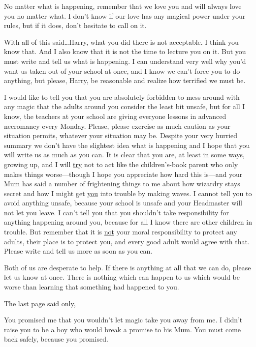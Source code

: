 \begin{writtenNote}
No matter what is happening, remember that we love you and will always
love you no matter what. I don't know if our love has any magical power under
your rules, but if it does, don't hesitate to call on it.

With all of this said…Harry, what you did there is not
acceptable. I think you know that. And I also know that it is not the time to
lecture you on it. But you must write and tell us what is happening. I can
understand very well why you'd want us taken out of your school at once, and I
know we can't force you to do anything, but please, Harry, be reasonable and
realize how terrified we must be.

I would like to tell you that you are absolutely forbidden to mess around
with any magic that the adults around you consider the least bit unsafe, but
for all I know, the teachers at your school are giving everyone lessons in
advanced necromancy every Monday. Please, please exercise as much caution as
your situation permits, whatever your situation may be. Despite your very
hurried summary we don't have the slightest idea what is happening and I hope
that you will write us as much as you can. It is clear that you are, at least
in some ways, growing up, and I will \underline{try} not to act like the
children's-book parent who only makes things worse---though I hope you
appreciate how hard this is---and your Mum has said a number of frightening
things to me about how wizardry stays secret and how I might get
\underline{you} into trouble by making waves. I cannot tell you to avoid
anything unsafe, because your school is unsafe and your Headmaster will not let
you leave. I can't tell you that you shouldn't take responsibility for anything
happening around you, because for all I know there are other children in
trouble. But remember that it is \underline{not} your moral responsibility to
protect any adults, their place is to protect you, and every good adult would
agree with that. Please write and tell us more as soon as you can.

Both of us are desperate to help. If there is anything at all that we can
do, please let us know at once. There is nothing which can happen to us which
would be worse than learning that something had happened to you.

\end{writtenNote}

The last page said only,

\begin{writtenNote}
You promised me that you wouldn't let magic take you away from me. I
didn't raise you to be a boy who would break a promise to his Mum. You must
come back safely, because you promised.

\end{writtenNote}

